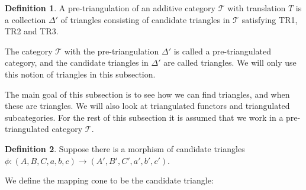 \documentclass[11pt]{article}
\theoremstyle{definition}
\newtheorem{definition}{Definition}[section]
\theoremstyle{remark}
\begin{document}
            \begin{definition}
                A pre-triangulation of an additive category $\mathcal{T}$ with translation $T$ is a collection $\Delta '$ of triangles consisting of candidate triangles in $\mathcal{T}$ satisfying TR1, TR2 and TR3.

                The category $\mathcal{T}$ with the pre-triangulation $\Delta '$ is called a pre-triangulated category, and the candidate triangles in $\Delta '$ are called  triangles. We will only use this notion of triangles in this subsection.
            \end{definition}

            The main goal of this subsection is to see how we can find  triangles, and when these are triangles. We will also look at triangulated functors and triangulated subcategories. For the rest of this subsection it is assumed that we work in a pre-triangulated category $\mathcal{T}$.

            \begin{definition}
                Suppose there is a morphism of candidate triangles $\phi : (A,B,C,a,b,c) \rightarrow (A',B',C',a',b',c')$.
                \begin{center}
                \end{center}
                We define the mapping cone to be the candidate triangle:
                \begin{center}
                \end{center}
            \end{definition}
\end{document}
